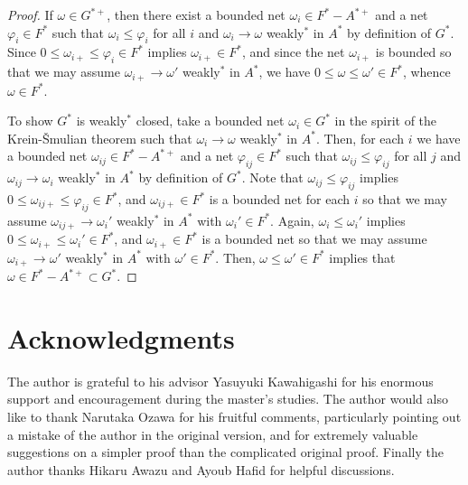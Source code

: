 \documentclass[noamsfonts,a4paper,10pt]{amsart}
\theoremstyle{plain}
\theoremstyle{definition}
\begin{document}
\begin{proof}
If $\omega\in G^{*+}$, then there exist a bounded net $\omega_i\in F^*-A^{*+}$ and a net $\varphi_i\in F^*$ such that $\omega_i\le\varphi_i$ for all $i$ and $\omega_i\to\omega$ weakly$^*$ in $A^*$ by definition of $G^*$.
Since $0\le\omega_{i+}\le\varphi_i\in F^*$ implies $\omega_{i+}\in F^*$, and since the net $\omega_{i+}$ is bounded so that we may assume $\omega_{i+}\to\omega'$ weakly$^*$ in $A^*$, we have $0\le\omega\le\omega'\in F^*$, whence $\omega\in F^*$.

To show $G^*$ is weakly$^*$ closed, take a bounded net $\omega_i\in G^*$ in the spirit of the Krein-\v Smulian theorem such that $\omega_i\to\omega$ weakly$^*$ in $A^*$.
Then, for each $i$ we have a bounded net $\omega_{ij}\in F^*-A^{*+}$ and a net $\varphi_{ij}\in F^*$ such that $\omega_{ij}\le\varphi_{ij}$ for all $j$ and $\omega_{ij}\to\omega_i$ weakly$^*$ in $A^*$ by definition of $G^*$.
Note that $\omega_{ij}\le\varphi_{ij}$ implies $0\le\omega_{ij+}\le\varphi_{ij}\in F^*$, and $\omega_{ij+}\in F^*$ is a bounded net for each $i$ so that we may assume $\omega_{ij+}\to\omega_i'$ weakly$^*$ in $A^*$ with $\omega_i'\in F^*$.
Again, $\omega_i\le\omega_i'$ implies $0\le\omega_{i+}\le\omega_i'\in F^*$, and $\omega_{i+}\in F^*$ is a bounded net so that we may assume $\omega_{i+}\to\omega'$ weakly$^*$ in $A^*$ with $\omega'\in F^*$.
Then, $\omega\le\omega'\in F^*$ implies that $\omega\in F^*-A^{*+}\subset G^*$.
\end{proof}

\section*{Acknowledgments}
The author is grateful to his advisor Yasuyuki Kawahigashi for his enormous support and encouragement during the master's studies.
The author would also like to thank Narutaka Ozawa for his fruitful comments, particularly pointing out a mistake of the author in the original version, and for extremely valuable suggestions on a simpler proof than the complicated original proof.
Finally the author thanks Hikaru Awazu and Ayoub Hafid for helpful discussions.



\end{document}
